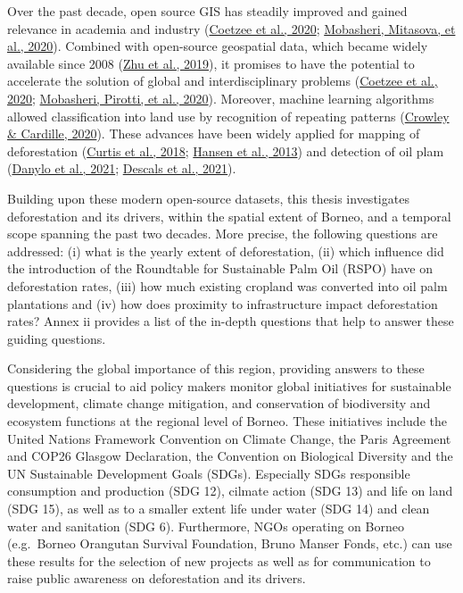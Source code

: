 \documentclass[
  letterpaper,
  DIV=11,
  numbers=noendperiod]{scrreprt}
\begin{document}
Over the past decade, open source GIS has steadily improved and gained
relevance in academia and industry
(\protect\hyperlink{ref-coetzeeOpenGeospatialSoftware2020}{Coetzee et
al., 2020};
\protect\hyperlink{ref-mobasheriHighlightingRecentTrends2020}{Mobasheri,
Mitasova, et al., 2020}). Combined with open-source geospatial data,
which became widely available since 2008
(\protect\hyperlink{ref-zhuBenefitsFreeOpen2019}{Zhu et al., 2019}), it
promises to have the potential to accelerate the solution of global and
interdisciplinary problems
(\protect\hyperlink{ref-coetzeeOpenGeospatialSoftware2020}{Coetzee et
al., 2020};
\protect\hyperlink{ref-mobasheriOpensourceGeospatialTools2020}{Mobasheri,
Pirotti, et al., 2020}). Moreover, machine learning algorithms allowed
classification into land use by recognition of repeating patterns
(\protect\hyperlink{ref-crowleyRemoteSensingRecent2020}{Crowley \&
Cardille, 2020}). These advances have been widely applied for mapping of
deforestation
(\protect\hyperlink{ref-curtisClassifyingDriversGlobal2018}{Curtis et
al., 2018};
\protect\hyperlink{ref-hansenHighResolutionGlobalMaps2013}{Hansen et
al., 2013}) and detection of oil plam
(\protect\hyperlink{ref-danyloMapExtentYear2021}{Danylo et al., 2021};
\protect\hyperlink{ref-descalsHighresolutionGlobalMap2021}{Descals et
al., 2021}).

Building upon these modern open-source datasets, this thesis
investigates deforestation and its drivers, within the spatial extent of
Borneo, and a temporal scope spanning the past two decades. More
precise, the following questions are addressed: (i) what is the yearly
extent of deforestation, (ii) which influence did the introduction of
the Roundtable for Sustainable Palm Oil (RSPO) have on deforestation
rates, (iii) how much existing cropland was converted into oil palm
plantations and (iv) how does proximity to infrastructure impact
deforestation rates? Annex ii provides a list of the in-depth questions
that help to answer these guiding questions.

Considering the global importance of this region, providing answers to
these questions is crucial to aid policy makers monitor global
initiatives for sustainable development, climate change mitigation, and
conservation of biodiversity and ecosystem functions at the regional
level of Borneo. These initiatives include the United Nations Framework
Convention on Climate Change, the Paris Agreement and COP26 Glasgow
Declaration, the Convention on Biological Diversity and the UN
Sustainable Development Goals (SDGs). Especially SDGs responsible
consumption and production (SDG 12), cilmate action (SDG 13) and life on
land (SDG 15), as well as to a smaller extent life under water (SDG 14)
and clean water and sanitation (SDG 6). Furthermore, NGOs operating on
Borneo (e.g.~Borneo Orangutan Survival Foundation, Bruno Manser Fonds,
etc.) can use these results for the selection of new projects as well as
for communication to raise public awareness on deforestation and its
drivers.
\end{document}
